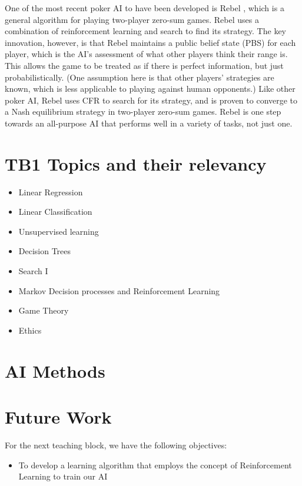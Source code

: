 \documentclass{article}
\begin{document}
\begin{multicols*}{2}
\newline
One of the most recent poker AI to have been developed is Rebel \cite{Rebel1} \cite{Rebel2}, which is a general algorithm for playing two-player zero-sum games. Rebel uses a combination of reinforcement learning and search to find its strategy. The key innovation, however, is that Rebel maintains a public belief state (PBS) for each player, which is the AI’s assessment of what other players think their range is. This allows the game to be treated as if there is perfect information, but just probabilistically. (One assumption here is that other players’ strategies are known, which is less applicable to playing against human opponents.) Like other poker AI, Rebel uses CFR to search for its strategy, and is proven to converge to a Nash equilibrium strategy in two-player zero-sum games. Rebel is one step towards an all-purpose AI that performs well in a variety of tasks, not just one.
\section{TB1 Topics and their relevancy}
\begin{itemize}
    \item Linear Regression
    \item Linear Classification
    \item Unsupervised learning
    \item Decision Trees
    \item Search I
    \item Markov Decision processes and Reinforcement Learning
    \item Game Theory
    \item Ethics
\end{itemize}
\section{AI Methods}

\section{Future Work}
For the next teaching block, we have the following objectives:
\begin{itemize}
    \item To develop a learning algorithm that employs the concept of Reinforcement Learning to train our AI


\end{itemize}
\end{multicols*}
\end{document}
